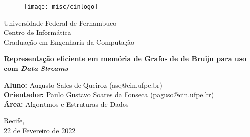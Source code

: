 \begin{figure}[!htpb]
	\centering
	\texttt{[image: misc/cinlogo]}
\end{figure}

\vspace{1cm}
\begin{center}
	{Universidade Federal de Pernambuco\\
	Centro de Informática\\
	Graduação em Engenharia da Computação}
\end{center}
\vspace{2cm}
\begin{center}
	\large{\textbf{Representação eficiente em memória de Grafos de de Bruijn para uso com \emph{Data Streams}}}
\end{center}
\vspace{2.5cm}

\begin{center}
    \textbf{Aluno:} Augusto Sales de Queiroz (asq@cin.ufpe.br) \\
    \leavevmode \newline
    \textbf{Orientador:} Paulo Gustavo Soares da Fonseca (paguso@cin.ufpe.br) \\
    \leavevmode \newline
    \textbf{Área:} Algoritmos e Estruturas de Dados \\
\end{center}

\vspace{4cm}
\begin{center}
    Recife,\\
    22 de Fevereiro de 2022
\end{center}

\thispagestyle{empty}
